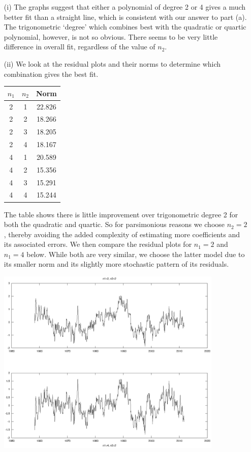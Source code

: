 \documentclass[11pt,a4paper]{article}
\begin{document}
\begin{enumerate}
	\begin{enumerate}
		\item[(i)] The graphs suggest that either a polynomial of degree 2 or 4 gives a much better fit than a straight line, which is consistent with our answer to part (a).  The trigonometric `degree' which combines best with the quadratic or quartic polynomial, however, is not so obvious. There seems to be very little difference in overall fit, regardless of the value of $n_2$.
		\item[(ii)] We look at the residual plots and their norms to determine which combination gives the best fit.
		\begin{center}
			\begin{tabular}{|c|c|c|}
			\hline
			$n_1$ &$n_2$ &Norm \\
			\hline
			2 &1 &22.826 \\
			2 &2 &18.266 \\
			2 &3 &18.205 \\
			2 &4 &18.167 \\
			4 &1 &20.589 \\
			4 &2 &15.356 \\
			4 &3 &15.291 \\
			4 &4 &15.244 \\
			\hline
			\end{tabular}
		\end{center}
		The table shows there is little improvement over trigonometric degree 2 for both the quadratic and quartic. So for parsimonious reasons we choose $n_2=2$, thereby avoiding the added complexity of estimating more coefficients and its associated errors. We then compare the residual plots for $n_1=2$ and $n_1=4$ below. While both are very similar, we choose the latter model due to its smaller norm and its slightly more stochastic pattern of its residuals.
			\begin{center}
			\includegraphics[width=0.85\textwidth]{ptres.eps}
		\end{center}
		

\end{enumerate}
\end{enumerate}
\end{document}
